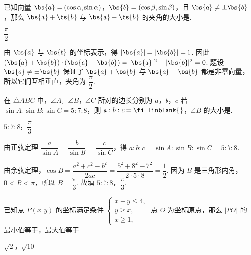 \begin{problem}
已知向量 \(\bs{a} = (\cos \alpha, \sin \alpha)\)，\(\bs{b} = (\cos \beta, \sin \beta)\)，且 \(\bs{a} \neq \pm \bs{b}\)，那么 \(\bs{a} + \bs{b}\) 与 \(\bs{a} - \bs{b}\) 的夹角的大小是\fillinblank{}.
\end{problem}

\begin{answer}
\(\dfrac{\pi}{2}\)
\end{answer}

\begin{solution}
由 \(\bs{a}\) 与 \(\bs{b}\) 的坐标表示，得 \(|\bs{a}|=|\bs{b}|=1\). 因此 \((\bs{a}+\bs{b})\cdot(\bs{a}-\bs{b})=|\bs{a}|^2-|\bs{b}|^2=0\). 题设 \(\bs{a}\ne\pm\bs{b}\) 保证了 \(\bs{a}+\bs{b}\) 与 \(\bs{a}-\bs{b}\) 都是非零向量，所以它们互相垂直，夹角为 \(\dfrac{\pi}{2}\).
\end{solution}

\begin{problem}
在 \(\triangle ABC\) 中，\(\angle A\)，\(\angle B\)，\(\angle C\) 所对的边长分别为 \(a\)，\(b\)，\(c\) 若 \(\sin A:\sin B:\sin C = 5:7:8\)，则 \(a:b:c =\fillinblank{}\)，\(\angle B\) 的大小是\fillinblank{}.
\end{problem}

\begin{answer}
\(5:7:8\)，\(\dfrac{\pi}{3}\)
\end{answer}

\begin{solution}
由正弦定理 \(\dfrac{a}{\sin A}=\dfrac{b}{\sin B}=\dfrac{c}{\sin C}\)，得 \(a:b:c=\sin A:\sin B:\sin C=5:7:8\).

由余弦定理，\(\cos B=\dfrac{a^2+c^2-b^2}{2ac}=\dfrac{5^2+8^2-7^2}{2\cdot5\cdot8}=\dfrac12\). 因为 \(B\) 是三角形内角，\(0<B<\pi\)，所以 \(B=\dfrac{\pi}{3}\). 故填 \(5:7:8\)，\(\dfrac{\pi}{3}\).
\end{solution}

\begin{problem}
已知点 \(P(x,y)\) 的坐标满足条件 \(\begin{cases}
x+y \leqslant 4,\\
y \geqslant x,\\
x \geqslant 1,
\end{cases}\) 点 \(O\) 为坐标原点，那么 \(|PO|\) 的最小值等于\fillinblank{}，最大值等于\fillinblank{}.
\end{problem}

\begin{answer}
\(\sqrt{2}\)，\(\sqrt{10}\)
\end{answer}

